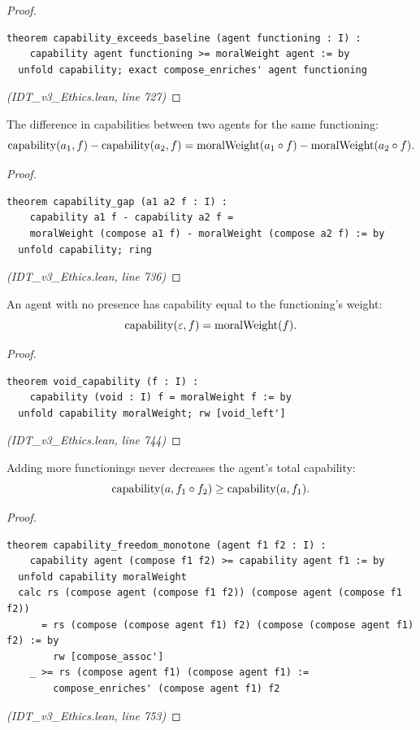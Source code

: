\begin{proof}
\begin{lstlisting}
theorem capability_exceeds_baseline (agent functioning : I) :
    capability agent functioning >= moralWeight agent := by
  unfold capability; exact compose_enriches' agent functioning
\end{lstlisting}
\textit{(IDT\_v3\_Ethics.lean, line 727)}
\end{proof}

\begin{theorem}
\label{thm:capability-gap}
The difference in capabilities between two agents for the same functioning:
\[
  \mathrm{capability}(a_1, f) - \mathrm{capability}(a_2, f) =
  \mathrm{moralWeight}(a_1 \circ f) - \mathrm{moralWeight}(a_2 \circ f).
\]
\end{theorem}

\begin{proof}
\begin{lstlisting}
theorem capability_gap (a1 a2 f : I) :
    capability a1 f - capability a2 f =
    moralWeight (compose a1 f) - moralWeight (compose a2 f) := by
  unfold capability; ring
\end{lstlisting}
\textit{(IDT\_v3\_Ethics.lean, line 736)}
\end{proof}

\begin{theorem}
\label{thm:void-capability}
An agent with no presence has capability equal to the functioning's weight:
\[
  \mathrm{capability}(\varepsilon, f) = \mathrm{moralWeight}(f).
\]
\end{theorem}

\begin{proof}
\begin{lstlisting}
theorem void_capability (f : I) :
    capability (void : I) f = moralWeight f := by
  unfold capability moralWeight; rw [void_left']
\end{lstlisting}
\textit{(IDT\_v3\_Ethics.lean, line 744)}
\end{proof}

\begin{theorem}
\label{thm:capability-monotone}
Adding more functionings never decreases the agent's total capability:
\[
  \mathrm{capability}(a, f_1 \circ f_2) \geq \mathrm{capability}(a, f_1).
\]
\end{theorem}

\begin{proof}
\begin{lstlisting}
theorem capability_freedom_monotone (agent f1 f2 : I) :
    capability agent (compose f1 f2) >= capability agent f1 := by
  unfold capability moralWeight
  calc rs (compose agent (compose f1 f2)) (compose agent (compose f1 f2))
      = rs (compose (compose agent f1) f2) (compose (compose agent f1) f2) := by
        rw [compose_assoc']
    _ >= rs (compose agent f1) (compose agent f1) :=
        compose_enriches' (compose agent f1) f2
\end{lstlisting}
\textit{(IDT\_v3\_Ethics.lean, line 753)}
\end{proof}


